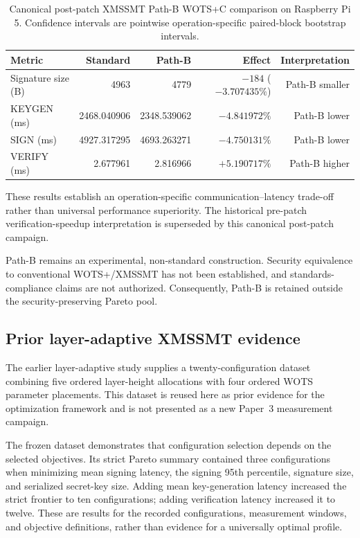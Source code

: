 \documentclass[pdflatex,sn-mathphys-num]{sn-jnl}
\begin{document}
\begin{table}[htbp]
\centering
\caption{Canonical post-patch XMSSMT Path-B WOTS+C comparison
on Raspberry Pi 5. Confidence intervals are pointwise
operation-specific paired-block bootstrap intervals.}
\label{tab:pathb-canonical-postpatch}
\begin{tabular}{lrrrr}
\hline
Metric & Standard & Path-B & Effect & Interpretation \\
\hline
Signature size (B)
& 4963 & 4779 & $-184$ ($-3.707435\%$) & Path-B smaller \\
KEYGEN (ms)
& 2468.040906 & 2348.539062 & $-4.841972\%$ & Path-B lower \\
SIGN (ms)
& 4927.317295 & 4693.263271 & $-4.750131\%$ & Path-B lower \\
VERIFY (ms)
& 2.677961 & 2.816966 & $+5.190717\%$ & Path-B higher \\
\hline
\end{tabular}
\end{table}

These results establish an operation-specific
communication--latency trade-off rather than universal
performance superiority. The historical pre-patch
verification-speedup interpretation is superseded by this
canonical post-patch campaign.

Path-B remains an experimental, non-standard construction.
Security equivalence to conventional WOTS+/XMSSMT has not been
established, and standards-compliance claims are not authorized.
Consequently, Path-B is retained outside the
security-preserving Pareto pool.

\subsection{Prior layer-adaptive XMSSMT evidence}
\label{subsec:prior_layer_adaptive_review}

The earlier layer-adaptive study supplies a twenty-configuration
dataset combining five ordered layer-height allocations with four
ordered WOTS parameter placements. This dataset is reused here as
prior evidence for the optimization framework and is not presented
as a new Paper~3 measurement campaign.

The frozen dataset demonstrates that configuration selection depends
on the selected objectives. Its strict Pareto summary contained three
configurations when minimizing mean signing latency, the signing
95th percentile, signature size, and serialized secret-key size.
Adding mean key-generation latency increased the strict frontier
to ten configurations; adding verification latency increased it
to twelve. These are results for the recorded configurations,
measurement windows, and objective definitions, rather than evidence
for a universally optimal profile.
\end{document}
